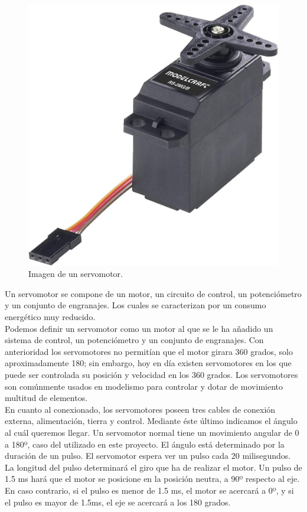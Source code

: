 \begin{figure}[H]
  \begin{center}
    \includegraphics[scale=0.1]{imagenes/servo.jpg}
  \end{center}
  \caption{Imagen de un servomotor.}
  \label{figure:servomotor:}
\end{figure}

Un servomotor se compone de un motor, un circuito de control, un potenciómetro y un conjunto de engranajes. Los cuales se caracterizan por un consumo energético muy reducido.\\

Podemos definir un servomotor como un motor al que se le ha añadido un sistema de control, un potenciómetro y un conjunto de engranajes. Con anterioridad los servomotores no
permitían que el motor girara 360 grados, solo aproximadamente 180; sin embargo, hoy en día existen servomotores en los que puede ser controlada
su posición y velocidad en los 360 grados. Los servomotores son comúnmente usados en modelismo para controlar y dotar de movimiento multitud de elementos.\\

En cuanto al conexionado, los servomotores poseen tres cables de conexión externa, alimentación, tierra y control. Mediante éste último indicamos el ángulo al cuál queremos llegar. 
Un servomotor normal tiene un movimiento angular de 0 a 180º, caso del utilizado en este proyecto. El ángulo está determinado por la duración de un pulso. El servomotor 
espera ver un pulso cada 20 milisegundos. La longitud del pulso determinará el giro que ha de realizar el motor. Un pulso de 1.5 ms hará que el motor se posicione en la posición 
neutra, a 90º respecto al eje. En caso contrario, si el pulso es menor de 1.5 ms,  el motor se acercará a 0º, y si el pulso es mayor de 1.5ms, el eje se acercará a los 180 grados.\\

